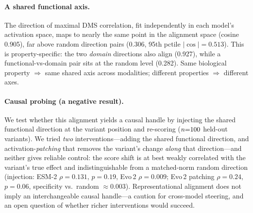 \paragraph{A shared functional axis.} The direction of maximal DMS correlation, fit independently in each model's activation space, maps to nearly the same point in the alignment space (cosine 0.905), far above random direction pairs (0.306, 95th pctile $|{\cos}|=0.513$). This is property-specific: the two \emph{domain} directions also align (0.927), while a functional-vs-domain pair sits at the random level (0.282). Same biological property $\Rightarrow$ same shared axis across modalities; different properties $\Rightarrow$ different axes.

\paragraph{Causal probing (a negative result).} We test whether this alignment yields a causal handle by injecting the shared functional direction at the variant position and re-scoring ($n{=}100{}$ held-out variants). We tried \emph{two} interventions---adding the shared functional direction, and activation-\emph{patching} that removes the variant's change \emph{along} that direction---and neither gives reliable control: the score shift is at best weakly correlated with the variant's true effect and indistinguishable from a matched-norm random direction (injection: ESM-2 $\rho{=}0.131$, $p{=}0.19$, Evo\,2 $\rho{=}0.009$; Evo\,2 patching $\rho{=}0.24$, $p{=}0.06$, specificity vs.\ random $\approx0.003$). Representational alignment does not imply an interchangeable causal handle---a caution for cross-model steering, and an open question of whether richer interventions would succeed.